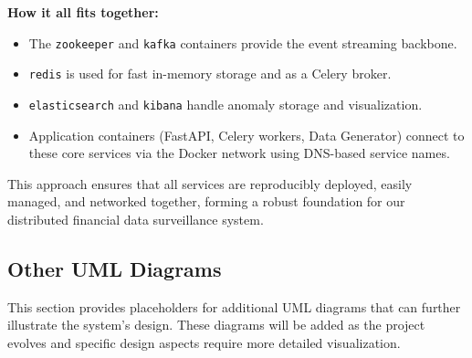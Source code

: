 \textbf{How it all fits together:}
\begin{itemize}
    \item The \texttt{zookeeper} and \texttt{kafka} containers provide the event streaming backbone.
    \item \texttt{redis} is used for fast in-memory storage and as a Celery broker.
    \item \texttt{elasticsearch} and \texttt{kibana} handle anomaly storage and visualization.
    \item Application containers (FastAPI, Celery workers, Data Generator) connect to these core services via the Docker network using DNS-based service names.
\end{itemize}

This approach ensures that all services are reproducibly deployed, easily managed, and networked together, forming a robust foundation for our distributed financial data surveillance system.

\subsection{Other UML Diagrams}
This section provides placeholders for additional UML diagrams that can further illustrate the system's design. These diagrams will be added as the project evolves and specific design aspects require more detailed visualization.




